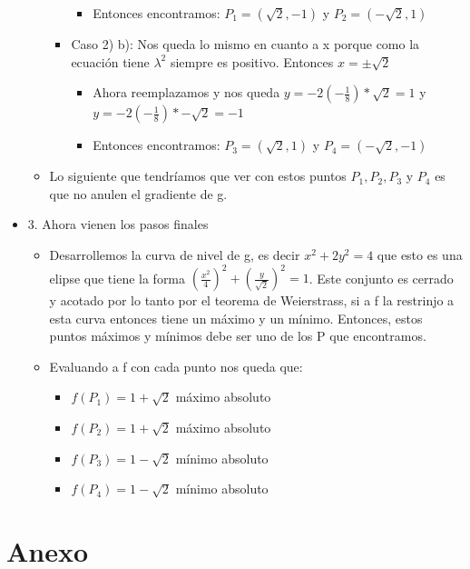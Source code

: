\documentclass[10pt,a4paper]{article}
\begin{document}
\begin{itemize}
\begin{itemize}
\begin{itemize}
\begin{itemize}
                    \item Entonces encontramos: $P_{1} = (\sqrt{2}, -1)$ y $P_{2} = (-\sqrt{2}, 1)$
                \end{itemize}
                \item Caso 2) b): Nos queda lo mismo en cuanto a x porque como la ecuación tiene $\lambda^{2}$ siempre es positivo. Entonces $x = \pm \sqrt{2}$ 
                \begin{itemize}
                    \item Ahora reemplazamos y nos queda $y = -2(-\frac{1}{8}) * \sqrt{2} = 1$ y $y = -2(-\frac{1}{8}) * -\sqrt{2} = -1 $
                    \item Entonces encontramos: $P_{3} = (\sqrt{2}, 1)$ y $P_{4} = (-\sqrt{2}, -1)$
                \end{itemize}
            \end{itemize}
            \item Lo siguiente que tendríamos que ver con estos puntos $P_{1}, P_{2}, P_{3} $ y $P_{4}$ es que no anulen el gradiente de g.
        \end{itemize}
        \item 3. Ahora vienen los pasos finales
        \begin{itemize}
            \item Desarrollemos la curva de nivel de g, es decir $x^{2} + 2y^{2} = 4$ que esto es una elipse que tiene la forma $(\frac{x^{2}}{4})^{2} + (\frac{y}{\sqrt{2}})^{2} = 1$. Este conjunto es cerrado y acotado por lo tanto por el teorema de Weierstrass, si a f la restrinjo a esta curva entonces tiene un máximo y un mínimo. Entonces, estos puntos máximos y mínimos debe ser uno de los P que encontramos.
            \item Evaluando a f con cada punto nos queda que: 
            \begin{itemize}
                \item $f(P_{1}) = 1 + \sqrt{2}$ máximo absoluto
                \item $f(P_{2}) = 1 + \sqrt{2}$ máximo absoluto 
                \item $f(P_{3}) = 1 - \sqrt{2}$ mínimo absoluto
                \item $f(P_{4}) = 1 - \sqrt{2}$ mínimo absoluto
            \end{itemize}
        \end{itemize}
    \end{itemize}
\section*{Anexo}
\end{document}
